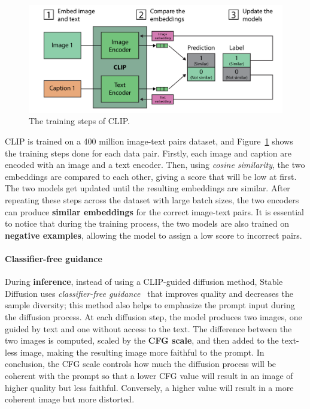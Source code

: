 \documentclass[preprint]{elsarticle}
\begin{document}
\begin{figure}[t]
	\centering
    \includegraphics[scale=0.85]{img/svg/Clip.png}
	\caption{The training steps of CLIP.}\label{fig:clip-training}
\end{figure}

CLIP is trained on a 400 million image-text pairs dataset, and Figure~\ref{fig:clip-training} shows the training steps done for each 
data pair.
Firstly, each image and caption are encoded with an image and a text encoder. Then, using \emph{cosine similarity},  the two embeddings are compared to each other, giving a score that will be low at first. 
The two models get updated until the resulting embeddings are similar. 
After repeating these steps across the dataset with large batch sizes, the two encoders can produce \textbf{similar embeddings} 
for the correct image-text pairs. It is essential to notice that during the training process, 
the two models are also trained on \textbf{negative examples}, allowing the model to assign a low score to incorrect pairs.



\paragraph{Classifier-free guidance}

During \textbf{inference}, instead of using a CLIP-guided diffusion method, Stable Diffusion uses 
\emph{classifier-free guidance}~\cite{ho2022classifierfree} that improves quality and decreases the sample diversity;  this method also helps to emphasize the prompt input during the diffusion process. 
At each diffusion step, the model produces two images, one guided by text and one without access to the text.  The difference between the two images is computed, scaled by the \textbf{CFG scale}, and then added to the text-less image,  making the resulting image more faithful to the prompt. 
In conclusion, the CFG scale controls how much the diffusion process will be coherent with the prompt so that a lower CFG value will result in an image of higher quality but less faithful. Conversely, a higher value will result in a more coherent image but more distorted.
\end{document}
